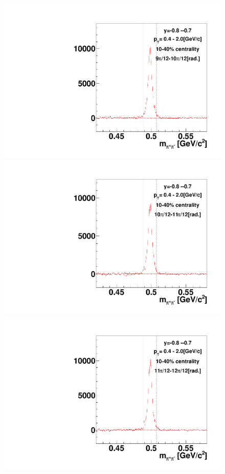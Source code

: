 \begin{figure}[h]
\includegraphics[width=0.14\linewidth]{chapterX/fig/ks_v1_sig/kf_ptslice0_cent1_ks_flow_phi10_rap12.pdf}
\includegraphics[width=0.14\linewidth]{chapterX/fig/ks_v1_sig/kf_ptslice0_cent1_ks_flow_phi11_rap12.pdf}
\includegraphics[width=0.14\linewidth]{chapterX/fig/ks_v1_sig/kf_ptslice0_cent1_ks_flow_phi12_rap12.pdf}


\end{figure}
